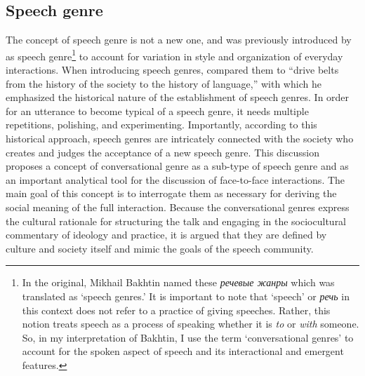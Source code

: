 \documentclass[12pt]{article}
\begin{document}
\subsection{Speech genre}
The concept of speech genre is not a new one, and was previously introduced by \textcite{bakhtin1986} as speech genre\footnote{In the original, Mikhail Bakhtin named these \foreignlanguage{russian}{\textit{речевые жанры}} which was translated as `speech genres.' It is important to note that `speech' or \foreignlanguage{russian}{\textit{речь}} in this context does not refer to a  practice of giving speeches. Rather, this notion treats speech as a process of speaking whether it is \textit{to} or \textit{with} someone. So, in my interpretation of Bakhtin, I use the term `conversational genres' to account for the spoken aspect of speech and its interactional and emergent features.} to account for variation in style and organization of everyday interactions. When introducing speech genres, \textcite[p. 65]{bakhtin1986} compared them to ``drive belts from the history of the society to the history of language,'' with which he emphasized the historical nature of the establishment of speech genres. In order for an utterance to become typical of a speech genre, it needs multiple repetitions, polishing, and experimenting. Importantly, according to this historical approach, speech genres are intricately connected with the society who creates and judges the acceptance of a new speech genre. This discussion proposes a concept of conversational genre as a sub-type of speech genre and as an important analytical tool for the discussion of face-to-face interactions. The main goal of this concept is to interrogate them as necessary for deriving the social meaning of the full interaction. Because the conversational genres express the cultural rationale for structuring the talk and engaging in the sociocultural commentary of ideology and practice, it is argued that they are defined by culture and society itself and mimic the goals of the speech community. 
\end{document}
